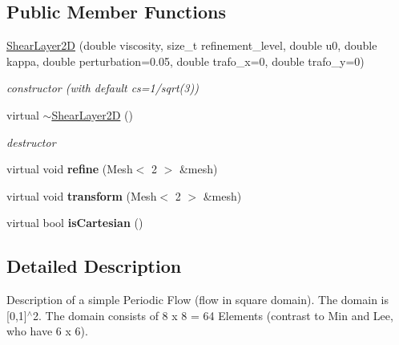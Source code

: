 \subsection*{Public Member Functions}
\begin{DoxyCompactItemize}
\item 
\hyperlink{classnatrium_1_1ShearLayer2D_a471304728fbf5bcae19f815d386e2f6c}{ShearLayer2D} (double viscosity, size\_\-t refinement\_\-level, double u0, double kappa, double perturbation=0.05, double trafo\_\-x=0, double trafo\_\-y=0)
\begin{DoxyCompactList}\small\item\em constructor (with default cs=1/sqrt(3)) \item\end{DoxyCompactList}\item 
\hypertarget{classnatrium_1_1ShearLayer2D_ac15c8dc03cc5a7fbb594b863ddac4bce}{
virtual \hyperlink{classnatrium_1_1ShearLayer2D_ac15c8dc03cc5a7fbb594b863ddac4bce}{$\sim$ShearLayer2D} ()}
\label{classnatrium_1_1ShearLayer2D_ac15c8dc03cc5a7fbb594b863ddac4bce}

\begin{DoxyCompactList}\small\item\em destructor \item\end{DoxyCompactList}\item 
\hypertarget{classnatrium_1_1ShearLayer2D_a58306e2c321765071614fbd1839ae1ee}{
virtual void {\bfseries refine} (Mesh$<$ 2 $>$ \&mesh)}
\label{classnatrium_1_1ShearLayer2D_a58306e2c321765071614fbd1839ae1ee}

\item 
\hypertarget{classnatrium_1_1ShearLayer2D_ac040c6c2592809529b1700b71acbd049}{
virtual void {\bfseries transform} (Mesh$<$ 2 $>$ \&mesh)}
\label{classnatrium_1_1ShearLayer2D_ac040c6c2592809529b1700b71acbd049}

\item 
\hypertarget{classnatrium_1_1ShearLayer2D_a702544a11e40afae6c9268e7c2fa4854}{
virtual bool {\bfseries isCartesian} ()}
\label{classnatrium_1_1ShearLayer2D_a702544a11e40afae6c9268e7c2fa4854}

\end{DoxyCompactItemize}


\subsection{Detailed Description}
Description of a simple Periodic Flow (flow in square domain). The domain is \mbox{[}0,1\mbox{]}$^\wedge$2. The domain consists of 8 x 8 = 64 Elements (contrast to Min and Lee, who have 6 x 6). 

